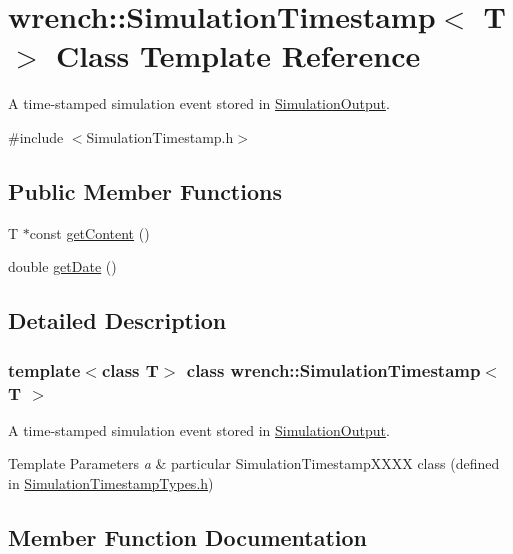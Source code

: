 \hypertarget{classwrench_1_1_simulation_timestamp}{}\section{wrench\+:\+:Simulation\+Timestamp$<$ T $>$ Class Template Reference}
\label{classwrench_1_1_simulation_timestamp}


A time-\/stamped simulation event stored in \hyperlink{classwrench_1_1_simulation_output}{Simulation\+Output}.  




{\ttfamily \#include $<$Simulation\+Timestamp.\+h$>$}

\subsection*{Public Member Functions}
\begin{DoxyCompactItemize}
\item 
T $\ast$const \hyperlink{classwrench_1_1_simulation_timestamp_a8ae8b15faae854fb1615a700fd620ab8}{get\+Content} ()
\item 
double \hyperlink{classwrench_1_1_simulation_timestamp_a706030fdac38ad1e853e588f7260c499}{get\+Date} ()
\end{DoxyCompactItemize}


\subsection{Detailed Description}
\subsubsection*{template$<$class T$>$\newline
class wrench\+::\+Simulation\+Timestamp$<$ T $>$}

A time-\/stamped simulation event stored in \hyperlink{classwrench_1_1_simulation_output}{Simulation\+Output}. 


\begin{DoxyTemplParams}{Template Parameters}
{\em a} & particular Simulation\+Timestamp\+X\+X\+XX class (defined in \hyperlink{_simulation_timestamp_types_8h_source}{Simulation\+Timestamp\+Types.\+h}) \\
\hline
\end{DoxyTemplParams}


\subsection{Member Function Documentation}
\mbox{\label{classwrench_1_1_simulation_timestamp_a8ae8b15faae854fb1615a700fd620ab8}} 
